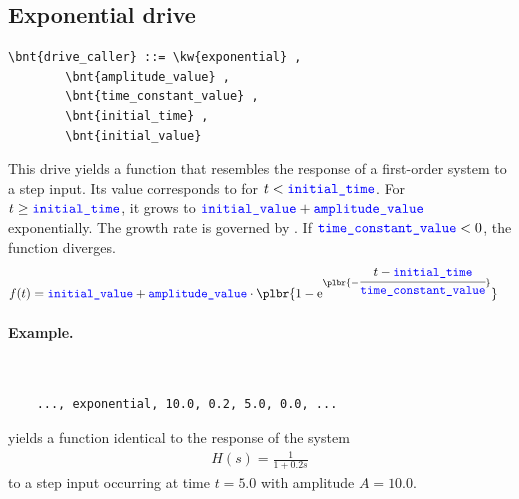 \subsection{Exponential drive}
\begin{Verbatim}[commandchars=\\\{\}]
    \bnt{drive_caller} ::= \kw{exponential} ,
        \bnt{amplitude_value} ,
        \bnt{time_constant_value} ,
        \bnt{initial_time} ,
        \bnt{initial_value}
\end{Verbatim}
This drive yields a function that resembles the response
of a first-order system to a step input.
Its value corresponds to 
for $t < \textcolor{blue}{\texttt{initial\_time}}$.
For $t \ge \textcolor{blue}{\texttt{initial\_time}}$, it grows to
$\textcolor{blue}{\texttt{initial\_value}} + \textcolor{blue}{\texttt{amplitude\_value}}$
exponentially.
The growth rate is governed by .
If $\textcolor{blue}{\texttt{time\_constant\_value}} < 0$, the function diverges.
\begin{align}
	f(t)
	&=
	\nt{initial\_value}
	+ \nt{amplitude\_value} \cdot \plbr{
		1 - \text{e}^{\plbr{-\cfrac{t - \nt{initial\_time}}{\nt{time\_constant\_value}}}}
	}
\end{align}

\paragraph{Example.} \
\begin{verbatim}
    ..., exponential, 10.0, 0.2, 5.0, 0.0, ...
\end{verbatim}
yields a function identical to the response of the system
\begin{align}
	H(s) = \frac{1}{1 + 0.2 s}
\end{align}
to a step input occurring at time $t=5.0$ with amplitude $A=10.0$.

